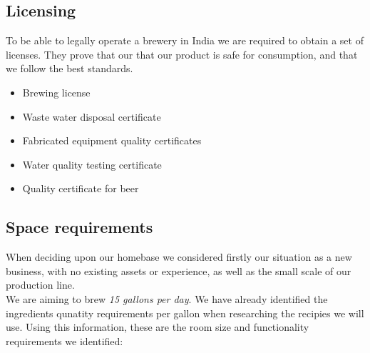 \documentclass{article}
\begin{document}
  \subsection{Licensing}
	To be able to legally operate a brewery in India we are required to obtain a set of licenses. They prove that our that our product is safe for consumption, and that we follow the best standards.\\
	\begin{itemize}
		\item Brewing license \\
		\item Waste water disposal certificate \\
		\item Fabricated equipment quality certificates \\
		\item Water quality testing certificate \\
		\item Quality certificate for beer \\
	\end{itemize}

	\subsection{Space requirements}
When deciding upon our homebase we considered firstly our situation as a new business, with no existing assets or experience, as well as the small scale of our production line. \\

We are aiming to brew \emph{15 gallons per day}. We have already identified the ingredients qunatity requirements per gallon when researching the recipies we will use. Using this information, these are the room size and functionality requirements we identified: \\
\end{document}
